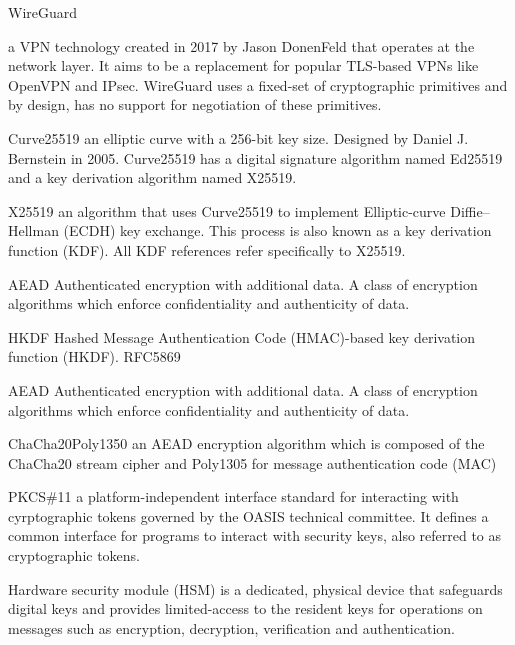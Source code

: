 \documentclass [11pt, proquest] {uwthesis}[2020/02/24]
\begin{document}
\begin{glossary}

\item[WireGuard]

a VPN technology created in 2017 by Jason DonenFeld that operates at the network layer. It aims to be a replacement for popular TLS-based VPNs like OpenVPN and IPsec. WireGuard uses a fixed-set of cryptographic primitives and by design, has no support for negotiation of these primitives. 

\item[Curve25519]
an elliptic curve with a 256-bit key size. Designed by Daniel J. Bernstein in 2005\cite{bernstein_curve25519_2005}. 
Curve25519 has a digital signature algorithm named Ed25519 and a key derivation algorithm named X25519.

\item[X25519]
an algorithm that uses Curve25519 to implement Elliptic-curve Diffie–Hellman (ECDH) key exchange. This process is also known as a key derivation function (KDF). All KDF references refer specifically to X25519.

\item[AEAD]
Authenticated encryption with additional data. A class of encryption algorithms which enforce confidentiality and authenticity of data. 

\item{HKDF}
Hashed Message Authentication Code (HMAC)-based key derivation function (HKDF). RFC5869 \cite{krawczyk_hmac-based_2010}

\item[AEAD]
Authenticated encryption with additional data. A class of encryption algorithms which enforce confidentiality and authenticity of data. 

\item[ChaCha20Poly1350]
an AEAD encryption algorithm which is composed of the ChaCha20 stream cipher and Poly1305 for message authentication code (MAC)

\item[PKCS\#11] a platform-independent interface standard for interacting with cyrptographic tokens governed by the OASIS technical committee\cite{noauthor_cryptsoft_2020}.
It defines a common interface for programs to interact with security keys, also referred to as cryptographic tokens.

\item[Hardware security module]
(HSM) is a dedicated, physical device that safeguards digital keys and provides limited-access to the resident keys for operations on messages such as encryption, decryption, verification and authentication. 


\end{glossary}
\end{document}

